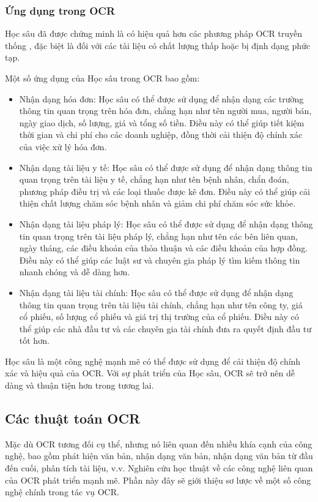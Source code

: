 \subsubsection{Ứng dụng trong OCR}
Học sâu đã được chứng minh là có hiệu quả hơn các phương pháp OCR truyền thống \cite{ai-vs-traditional}, đặc biệt là đối với các tài liệu có chất lượng thấp hoặc bị định dạng phức tạp.

Một số ứng dụng của Học sâu trong OCR bao gồm:
\begin{itemize}
    \item Nhận dạng hóa đơn: Học sâu có thể được sử dụng để nhận dạng các trường thông tin quan trọng trên hóa đơn, chẳng hạn như tên người mua, người bán, ngày giao dịch, số lượng, giá và tổng số tiền. Điều này có thể giúp tiết kiệm thời gian và chi phí cho các doanh nghiệp, đồng thời cải thiện độ chính xác của việc xử lý hóa đơn.
    \item Nhận dạng tài liệu y tế: Học sâu có thể được sử dụng để nhận dạng thông tin quan trọng trên tài liệu y tế, chẳng hạn như tên bệnh nhân, chẩn đoán, phương pháp điều trị và các loại thuốc được kê đơn. Điều này có thể giúp cải thiện chất lượng chăm sóc bệnh nhân và giảm chi phí chăm sóc sức khỏe.
    \item Nhận dạng tài liệu pháp lý: Học sâu có thể được sử dụng để nhận dạng thông tin quan trọng trên tài liệu pháp lý, chẳng hạn như tên các bên liên quan, ngày tháng, các điều khoản của thỏa thuận và các điều khoản của hợp đồng. Điều này có thể giúp các luật sư và chuyên gia pháp lý tìm kiếm thông tin nhanh chóng và dễ dàng hơn.
    \item Nhận dạng tài liệu tài chính: Học sâu có thể được sử dụng để nhận dạng thông tin quan trọng trên tài liệu tài chính, chẳng hạn như tên công ty, giá cổ phiếu, số lượng cổ phiếu và giá trị thị trường của cổ phiếu. Điều này có thể giúp các nhà đầu tư và các chuyên gia tài chính đưa ra quyết định đầu tư tốt hơn.
\end{itemize}
Học sâu là một công nghệ mạnh mẽ có thể được sử dụng để cải thiện độ chính xác và hiệu quả của OCR. Với sự phát triển của Học sâu, OCR sẽ trở nên dễ dàng và thuận tiện hơn trong tương lai.

\subsection{Các thuật toán OCR}
Mặc dù OCR tương đối cụ thể, nhưng nó liên quan đến nhiều khía cạnh của công nghệ, bao gồm phát hiện văn bản, nhận dạng văn bản, nhận dạng văn bản từ đầu đến cuối, phân tích tài liệu, v.v. Nghiên cứu học thuật về các công nghệ liên quan của OCR phát triển mạnh mẽ. Phần này đây sẽ giới thiệu sơ lược về một số công nghệ chính trong tác vụ OCR.
